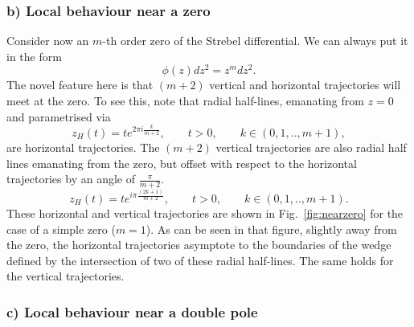 \documentclass[english]{article}
\begin{document}
\subsubsection*{b) Local behaviour near a zero}

Consider now an $m$-th order zero of the Strebel differential. We can always put it in the form 
\begin{equation}
    \phi(z)dz^2 = z^m dz^2 .
\end{equation}
The novel feature here is that $(m+2)$ vertical and horizontal trajectories will meet at the zero. To see this, note that radial half-lines, emanating from $z=0$ and parametrised via 
\begin{equation}
    z_{H}(t)=t e^{2\pi i \frac{k}{m+2}}, \quad \quad t>0,\qquad  k \in (0,1,..,m+1),
\end{equation}
are horizontal trajectories. The $(m+2)$ vertical trajectories are also radial half lines emanating from the zero, but offset with respect to the horizontal trajectories by an angle of $\frac{\pi}{m+2}$.
\begin{equation}
    z_{H}(t)=t e^{i \pi \frac{(2k+1)}{m+2}}, \quad \quad t>0, \qquad k \in (0,1,..,m+1).
\end{equation}
These horizontal and vertical trajectories are shown in Fig.~\ref{fig:nearzero} for the case of a simple zero ($m=1$). As can be seen in that figure, slightly away from the zero, the horizontal trajectories asymptote to the boundaries of the wedge defined by the intersection of two of these radial half-lines. The same holds for the vertical trajectories. 

\subsubsection*{c) Local behaviour near a double pole}
\end{document}
